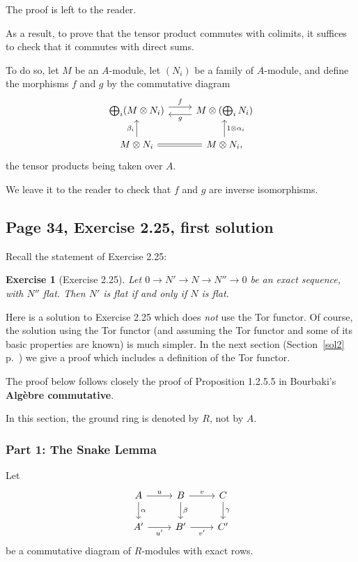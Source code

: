 \documentclass[parskip=half,fontsize=12pt]{scrartcl}%
\newtheorem{exo}[thm]{Exercise}
\begin{document}
The proof is left to the reader.

As a result, to prove that the tensor product commutes with colimits, it suffices to check that it commutes with direct sums. 

To do so, let $M$ be an $A$-module, let $(N_i)$ be a family of $A$-module, and define the morphisms $f$ and $g$ by the commutative diagram 
$$
\begin{tikzcd} 
\bigoplus_i(M\otimes N_i)\ar[r,yshift=0.9ex,"f"]\ar[r,leftarrow,yshift=-0.9ex,"g"']& M\otimes\left(\bigoplus_iN_i\right)\\ 
M\otimes N_i\ar[u,"\beta_i"]\ar[r,equal]&M\otimes N_i,\ar[u,"1\otimes\alpha_i"']
\end{tikzcd}
$$ 
the tensor products being taken over $A$.

We leave it to the reader to check that $f$ and $g$ are inverse isomorphisms.

\subsection{Page 34, Exercise 2.25, first solution}\label{s225a}%

Recall the statement of Exercise 2.25:

\begin{exo}[Exercise 2.25]\label{e225}
Let $0\to N'\to N\to N''\to0$ be an exact sequence, with $N''$ flat. Then $N'$ is flat if and only if $N$ is flat.
\end{exo}

Here is a solution to Exercise 2.25 which does \emph{not} use the Tor functor. Of course, the solution using the Tor functor (and assuming the Tor functor and some of its basic properties are known) is much simpler. In the next section (Section~\ref{sol2} p.~\pageref{sol2}) we give a proof which includes a definition of the Tor functor.

The proof below follows closely the proof of Proposition 1.2.5.5 in Bourbaki's \textbf{Algèbre commutative}.

In this section, the ground ring is denoted by $R$, not by $A$.

\subsubsection{Part 1: The Snake Lemma}\label{ssl}

Let 
\begin{equation}\label{b10}
\begin{tikzcd}
A\ar[d,"\alpha"]\ar[r,"u"]&B\ar[d,"\beta"]\ar[r,"v"]&C\ar[d,"\gamma"]\\ 
A'\ar[r,"u'"']&B'\ar[r,"v'"']&C'
\end{tikzcd}
\end{equation}
be a commutative diagram of $R$-modules with exact rows. 
\end{document}
